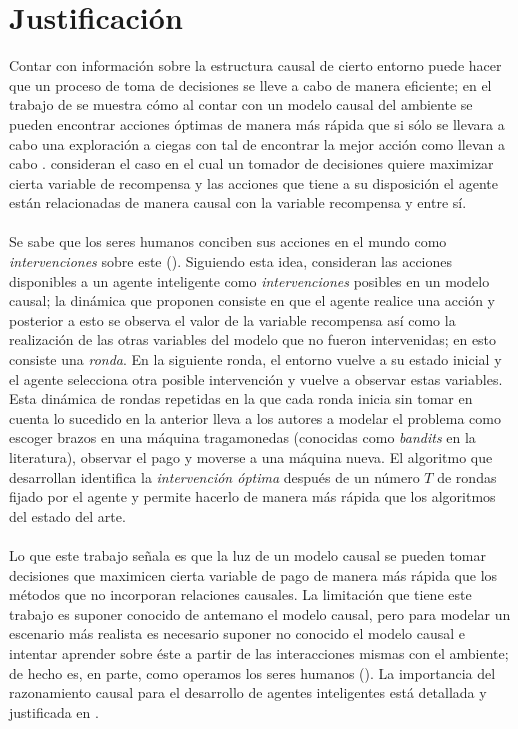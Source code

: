 \documentclass[11pt]{article}
\theoremstyle{plain}
\begin{document}
\section{Justificación}
Contar con información sobre la estructura causal de cierto entorno puede hacer que un proceso de toma de decisiones se lleve a cabo de manera eficiente; en el trabajo de \cite{lattimoreNIPS2016} se muestra cómo al contar con un modelo causal del ambiente se pueden encontrar acciones óptimas de manera más rápida que si sólo se llevara a cabo una exploración a ciegas con tal de encontrar la mejor acción como llevan a cabo \cite{audibert2010best}. \cite{lattimoreNIPS2016} consideran el caso en el cual un tomador de decisiones quiere maximizar cierta variable de recompensa y las acciones que tiene a su disposición el agente están relacionadas de manera causal con la variable recompensa y entre sí.\\
\\
\indent Se sabe que los seres humanos conciben sus acciones en el mundo como \textit{intervenciones} sobre este (\cite{hagmayer2009decision}). Siguiendo esta idea,  \cite{lattimoreNIPS2016} consideran las acciones disponibles a un agente inteligente como \textit{intervenciones} posibles en un modelo causal; la dinámica que proponen consiste en que el agente realice una acción y posterior a esto se observa el valor de la variable recompensa así como la realización de las otras variables del modelo que no fueron intervenidas; en esto consiste una \textit{ronda}. En la siguiente ronda, el entorno vuelve a su estado inicial y el agente selecciona otra posible intervención y vuelve a observar estas variables. Esta dinámica de rondas repetidas en la que cada ronda inicia sin tomar en cuenta lo sucedido en la anterior lleva a los autores a modelar el problema como escoger brazos en una máquina tragamonedas (conocidas como \textit{bandits} en la literatura), observar el pago y moverse a una máquina nueva. El algoritmo que desarrollan identifica la \textit{intervención óptima} después de un número $T$ de rondas fijado por el agente y permite hacerlo de manera más rápida que los algoritmos del estado del arte.\\
\\
\indent Lo que este trabajo señala es que  la luz de un modelo causal se pueden tomar decisiones que maximicen cierta variable de pago de manera más rápida que los métodos que no incorporan relaciones causales. La limitación que tiene este trabajo es suponer conocido de antemano el modelo causal, pero para modelar un escenario más realista es necesario suponer no conocido el modelo causal e intentar aprender sobre éste a partir de las interacciones mismas con el ambiente; de hecho es, en parte, como operamos los seres humanos (\cite{hagmayer2013repeated}). La importancia del razonamiento causal para el desarrollo de agentes inteligentes está detallada y justificada en \cite{lake2017building}.\\
\end{document}
